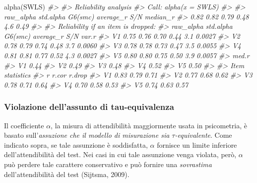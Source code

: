 \documentclass[
  11pt,
]{krantz}
\makeatletter
\newenvironment{Shaded}{\begin{snugshade}}{\end{snugshade}}
\newcommand{\CommentTok}[1]{\textcolor[rgb]{0.37,0.37,0.37}{\textit{#1}}}
\newcommand{\FunctionTok}[1]{\textcolor[rgb]{0,0,0}{#1}}
\newcommand{\NormalTok}[1]{#1}
\newenvironment{kframe}{%
\medskip{}
\setlength{\fboxsep}{.8em}
 \def\at@end@of@kframe{}%
 \ifinner\ifhmode%
  \def\at@end@of@kframe{\end{minipage}}%
  \begin{minipage}{\columnwidth}%
 \fi\fi%
 \def\FrameCommand##1{\hskip\@totalleftmargin \hskip-\fboxsep
 \colorbox{shadecolor}{##1}\hskip-\fboxsep
     \hskip-\linewidth \hskip-\@totalleftmargin \hskip\columnwidth}%
 \MakeFramed {\advance\hsize-\width
   \@totalleftmargin\z@ \linewidth\hsize
   \@setminipage}}%
 {\par\unskip\endMakeFramed%
 \at@end@of@kframe}
\renewenvironment{Shaded}{\begin{kframe}}{\end{kframe}}
\theoremstyle{definition}
\theoremstyle{definition}
\theoremstyle{definition}
\theoremstyle{definition}
\theoremstyle{remark}
\makeatother
\begin{document}
\begin{Shaded}
\begin{Highlighting}[]
\FunctionTok{alpha}\NormalTok{(SWLS)}
\CommentTok{\#\textgreater{} }
\CommentTok{\#\textgreater{} Reliability analysis   }
\CommentTok{\#\textgreater{} Call: alpha(x = SWLS)}
\CommentTok{\#\textgreater{} }
\CommentTok{\#\textgreater{}   raw\_alpha std.alpha G6(smc) average\_r S/N median\_r}
\CommentTok{\#\textgreater{}       0.82      0.82    0.79      0.48 4.6     0.49}
\CommentTok{\#\textgreater{} }
\CommentTok{\#\textgreater{}  Reliability if an item is dropped:}
\CommentTok{\#\textgreater{}    raw\_alpha std.alpha G6(smc) average\_r S/N  var.r}
\CommentTok{\#\textgreater{} V1      0.75      0.76    0.70      0.44 3.1 0.0027}
\CommentTok{\#\textgreater{} V2      0.78      0.79    0.74      0.48 3.7 0.0060}
\CommentTok{\#\textgreater{} V3      0.78      0.78    0.73      0.47 3.5 0.0055}
\CommentTok{\#\textgreater{} V4      0.81      0.81    0.77      0.52 4.3 0.0027}
\CommentTok{\#\textgreater{} V5      0.80      0.80    0.75      0.50 3.9 0.0057}
\CommentTok{\#\textgreater{}    med.r}
\CommentTok{\#\textgreater{} V1  0.44}
\CommentTok{\#\textgreater{} V2  0.49}
\CommentTok{\#\textgreater{} V3  0.48}
\CommentTok{\#\textgreater{} V4  0.52}
\CommentTok{\#\textgreater{} V5  0.50}
\CommentTok{\#\textgreater{} }
\CommentTok{\#\textgreater{}  Item statistics }
\CommentTok{\#\textgreater{}       r r.cor r.drop}
\CommentTok{\#\textgreater{} V1 0.83  0.79   0.71}
\CommentTok{\#\textgreater{} V2 0.77  0.68   0.62}
\CommentTok{\#\textgreater{} V3 0.78  0.71   0.64}
\CommentTok{\#\textgreater{} V4 0.70  0.58   0.53}
\CommentTok{\#\textgreater{} V5 0.74  0.63   0.57}
\end{Highlighting}
\end{Shaded}

\hypertarget{sec:violazione_tau}{%
\subsubsection{Violazione dell'assunto di tau-equivalenza}\label{sec:violazione_tau}}

Il coefficiente \(\alpha\), la misura di attendibilità maggiormente usata in psicometria, è basato sull'\emph{assuzione che il modello di misurazione sia \(\tau\)-equivalente}. Come indicato sopra, se tale assunzione è soddisfatta, \(\alpha\) fornisce un limite inferiore dell'attendibilità del test. Nei casi in cui tale assunzione venga violata, però, \(\alpha\) può perdere tale carattere conservativo e può fornire una \emph{sovrastima} dell'attendibilità del test (Sijtsma, 2009).
\end{document}
